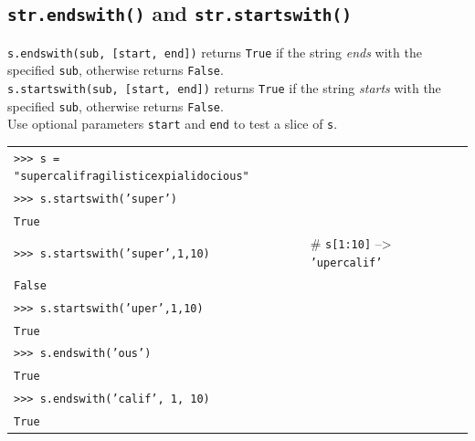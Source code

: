 \documentclass[t,handout,9pt]{beamer}
\begin{document}
\subsection{\texttt{str.endswith()} and \texttt{str.startswith()}}
\begin{frame}
\texttt{s.endswith(sub, [start, end])} returns \texttt{True} if the string \textit{ends} with the specified \texttt{sub}, otherwise returns \texttt{False}. \\%
\texttt{s.startswith(sub, [start, end])} returns \texttt{True} if the string \textit{starts} with the specified \texttt{sub}, otherwise returns \texttt{False}.\\
Use optional parameters \texttt{start} and \texttt{end} to test a slice of \texttt{s}.
\vfill
\begin{table}[]
\begin{flushleft}
\begin{tabular}{ll}
\texttt{>{}>{}> s = "supercalifragilisticexpialidocious"} &  \\
\texttt{>{}>{}> s.startswith('super')} &  \\
\texttt{True} &  \\
\texttt{>{}>{}> s.startswith('super',1,10)} &  \# \texttt{s[1:10]} --> \texttt{'upercalif'}\\
\texttt{False} &  \\
\texttt{>{}>{}> s.startswith('uper',1,10)} &  \\
\texttt{True} &  \\
\texttt{>{}>{}> s.endswith('ous')} &  \\
\texttt{True} &  \\
\texttt{>{}>{}> s.endswith('calif', 1, 10)} &  \\
\texttt{True} &  \\
\end{tabular}
\end{flushleft}
\end{table}
\vfill
\end{frame}
%
\end{document}
